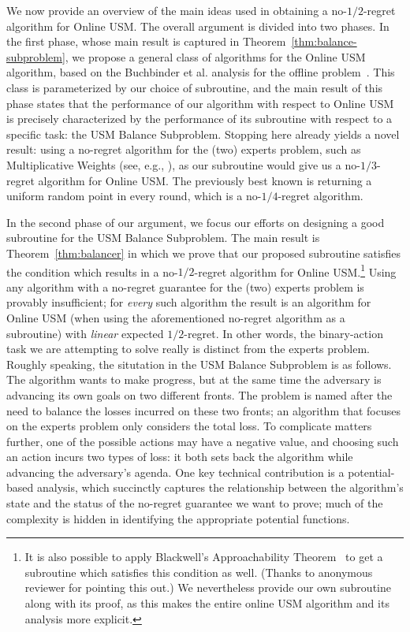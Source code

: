 \documentclass[final,12pt]{colt2018}
\newcommand{\BalanceSubproblem}{USM Balance Subproblem}
\newcommand{\OnlineUSM}{Online USM}
\begin{document}
We now provide an overview of the main ideas used in obtaining a no-$1/2$-regret algorithm for \OnlineUSM{}. The overall argument is divided into two phases. In the first phase, whose main result is captured in Theorem~\ref{thm:balance-subproblem}, we propose a general class of algorithms for the \OnlineUSM{} algorithm, based on the Buchbinder et al. analysis for the offline problem~\citep{BFNS15}. This class is parameterized by our choice of subroutine, and the main result of this phase states that the performance of our algorithm with respect to \OnlineUSM{} is precisely characterized by the performance of its subroutine with respect to a specific task: the \BalanceSubproblem{}. Stopping here already yields a novel result: using a no-regret algorithm for the (two) experts problem, such as Multiplicative Weights (see, e.g., \cite{CL06}), as our subroutine would give us a no-$1/3$-regret algorithm for \OnlineUSM{}. The previously best known is returning a uniform random point in every round, which is a no-$1/4$-regret algorithm.

In the second phase of our argument, we focus our efforts on designing
a good subroutine for the \BalanceSubproblem{}. The main result is
Theorem~\ref{thm:balancer} in which we prove that our proposed
subroutine satisfies the condition which results in a no-$1/2$-regret
algorithm for \OnlineUSM{}.\footnote{It is also possible to apply
  Blackwell's Approachability Theorem~\citep{Blackwell56} to get a
  subroutine which satisfies this condition as well.  (Thanks to
  anonymous reviewer for pointing this out.)  We nevertheless provide
  our own subroutine along with its proof, as this makes the entire
  online USM algorithm and its analysis more explicit.} Using any
algorithm with a no-regret guarantee for the (two) experts problem is
provably insufficient; for \emph{every} such algorithm the result is
an algorithm for \OnlineUSM{} (when using the aforementioned no-regret
algorithm as a subroutine) with \emph{linear} expected
$1/2$-regret. In other words, the binary-action task we are attempting
to solve really is distinct from the experts problem. Roughly
speaking, the situtation in the \BalanceSubproblem{} is as
follows. The algorithm wants to make progress, but at the same time
the adversary is advancing its own goals on two different fronts. The
problem is named after the need to balance the losses incurred on
these two fronts; an algorithm that focuses on the experts problem
only considers the total loss. To complicate matters further, one of
the possible actions may have a negative value, and choosing such an
action incurs two types of loss: it both sets back the algorithm while
advancing the adversary's agenda. One key technical contribution is a
potential-based analysis, which succinctly captures the relationship
between the algorithm's state and the status of the no-regret
guarantee we want to prove; much of the complexity is hidden in
identifying the appropriate potential functions.
\end{document}
